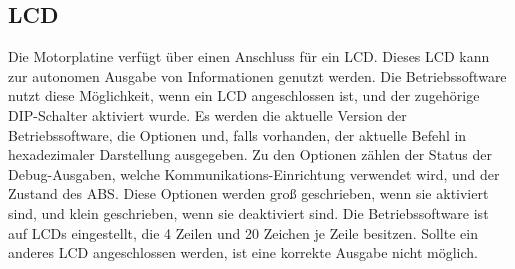 \subsection{LCD}
Die Motorplatine verfügt über einen Anschluss für ein LCD. Dieses LCD kann zur autonomen Ausgabe
von Informationen genutzt werden. Die Betriebssoftware nutzt diese Möglichkeit,
wenn ein LCD angeschlossen ist, und der zugehörige DIP-Schalter aktiviert wurde.
Es werden die aktuelle Version der Betriebssoftware, die Optionen und, falls vorhanden,
der aktuelle Befehl in hexadezimaler Darstellung ausgegeben. Zu den Optionen zählen der Status der Debug-Ausgaben,
welche Kommunikations-Einrichtung verwendet wird, und der Zustand des ABS. Diese Optionen
werden groß geschrieben, wenn sie aktiviert sind, und klein geschrieben, wenn sie
deaktiviert sind. Die Betriebssoftware ist auf LCDs eingestellt, die 4 Zeilen und 20 Zeichen je Zeile besitzen.
Sollte ein anderes LCD angeschlossen werden, ist eine korrekte Ausgabe nicht möglich.
